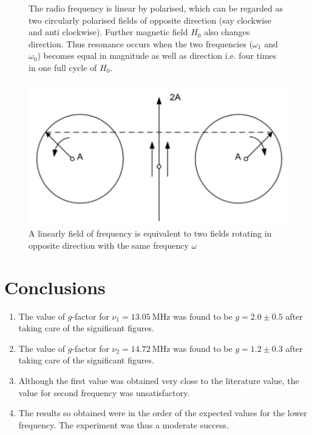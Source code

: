 \documentclass[%
 reprint,
nofootinbib,
 amsmath,amssymb,
 aps,
floatfix,
]{revtex4-2}
\begin{document}
\begin{enumerate}
\begin{figure}
        \caption{The radio frequency is linear by polarised, which can be regarded as two circularly polarised fields of opposite direction (say clockwise and anti clockwise). Further magnetic field $H_0$ also changes direction. Thus resonance occurs when the two frequencies ($\omega_1$ and $\omega_0$) becomes equal in magnitude as well as direction i.e. four times in one full cycle of $H_0$.}
        \label{fig:radfreq}
    \end{figure}
    \begin{figure}
        \centering
        \includegraphics[scale = 0.8]{Figures/linfreq.png}
        \caption{A linearly field of frequency is equivalent to two fields rotating in opposite direction with the same frequency $\omega$}
        \label{fig:linfreq}
    \end{figure}
\end{enumerate}

\section{Conclusions}
\begin{enumerate}
    \item The value of $g$-factor for $\nu_1 = \SI{13.05}{\mega \hertz}$ was found to be $g = 2.0 \pm 0.5$ after taking care of the significant figures.
    \item The value of $g$-factor for $\nu_2 = \SI{14.72}{\mega \hertz}$ was found to be $g = 1.2 \pm 0.3$ after taking care of the significant figures. 
    \item Although the first value was obtained very close to the literature value, the value for second frequency was unsatisfactory.
    \item The results so obtained were in the order of the expected values for the lower frequency. The experiment was thus a moderate success.
\end{enumerate}




\end{document}
